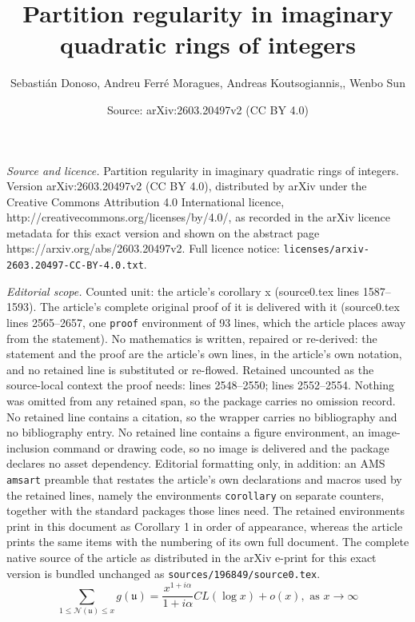 \documentclass[10pt,a4paper]{amsart}
\title{Partition regularity in imaginary quadratic rings of integers}
\author{Sebasti\'an Donoso, Andreu Ferr\'e Moragues, Andreas Koutsogiannis,, Wenbo Sun}
\date{Source: arXiv:2603.20497v2 (CC BY 4.0)}
\newcommand{\NN}{{\mathcal N}}
\newcommand{\mf}{\mathfrak}
\begin{document}
\maketitle

\noindent\emph{Source and licence.} Partition regularity in imaginary quadratic rings of integers. Version arXiv:2603.20497v2 (CC BY 4.0), distributed by arXiv under the Creative Commons Attribution 4.0 International licence, http://creativecommons.org/licenses/by/4.0/, as recorded in the arXiv licence metadata for this exact version and shown on the abstract page https://arxiv.org/abs/2603.20497v2. Full licence notice: \texttt{licenses/arxiv-2603.20497-CC-BY-4.0.txt}.\par\smallskip

\noindent\textit{Editorial scope.} Counted unit: the article's corollary x (source0.tex lines 1587--1593). The article's complete original proof of it is delivered with it (source0.tex lines 2565--2657, one \texttt{proof} environment of 93 lines, which the article places away from the statement). No mathematics is written, repaired or re-derived: the statement and the proof are the article's own lines, in the article's own notation, and no retained line is substituted or re-flowed.  Retained uncounted as the source-local context the proof needs: lines 2548--2550; lines 2552--2554.  Nothing was omitted from any retained span, so the package carries no omission record.  No retained line contains a citation, so the wrapper carries no bibliography and no bibliography entry.  No retained line contains a figure environment, an image-inclusion command or drawing code, so no image is delivered and the package declares no asset dependency.  Editorial formatting only, in addition: an AMS \texttt{amsart} preamble that restates the article's own declarations and macros used by the retained lines, namely the environments \texttt{corollary} on separate counters, together with the standard packages those lines need.  The retained environments print in this document as Corollary 1 in order of appearance, whereas the article prints the same items with the numbering of its own full document.  The complete native source of the article as distributed in the arXiv e-print for this exact version is bundled unchanged as \texttt{sources/196849/source0.tex}.
 \begin{equation}\label{1}
     \sum_{1\leq\NN(\mf u)\leq x}g(\mf u)=\frac{x^{1+i\alpha}}{1+i\alpha}CL(\log  x)+o(x), \text{ as }x\to\infty
 \end{equation}
\end{document}
